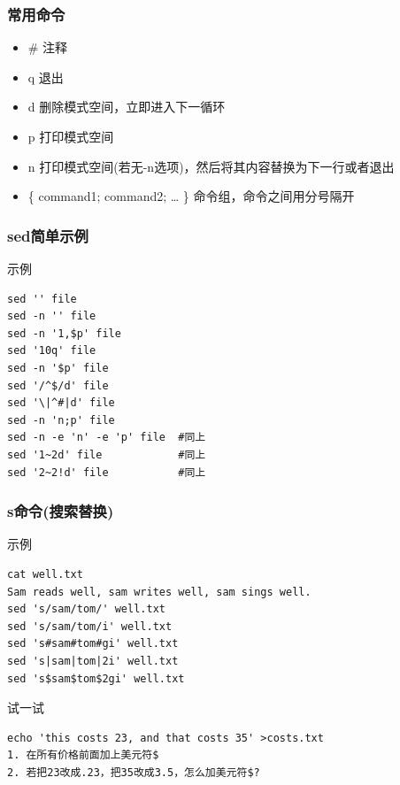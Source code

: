 \documentclass[xcolor=svgnames,presentation]{beamer}
\begin{document}
\begin{frame}
\frametitle{常用命令}
\label{sec-2-1-5}
\begin{itemize}

\item \#   注释
\label{sec-2-1-5-1}%

\item q    退出
\label{sec-2-1-5-2}%

\item d    删除模式空间，立即进入下一循环
\label{sec-2-1-5-3}%

\item p    打印模式空间
\label{sec-2-1-5-4}%

\item n    打印模式空间(若无-n选项)，然后将其内容替换为下一行或者退出
\label{sec-2-1-5-5}%

\item \{ command1; command2; \ldots{} \}    命令组，命令之间用分号隔开
\label{sec-2-1-5-6}%
\end{itemize} %
\end{frame}
\begin{frame}[fragile]
\frametitle{sed简单示例}
\label{sec-2-1-6}
\begin{exampleblock}{示例}
\label{sec-2-1-6-1}


\begin{verbatim}
sed '' file
sed -n '' file
sed -n '1,$p' file
sed '10q' file
sed -n '$p' file
sed '/^$/d' file
sed '\|^#|d' file
sed -n 'n;p' file
sed -n -e 'n' -e 'p' file  #同上
sed '1~2d' file            #同上
sed '2~2!d' file           #同上
\end{verbatim}
\end{exampleblock}
\end{frame}
\begin{frame}[fragile]
\frametitle{s命令(搜索替换)}
\label{sec-2-1-7}
\begin{exampleblock}{示例}
\label{sec-2-1-7-1}


\begin{verbatim}
cat well.txt
Sam reads well, sam writes well, sam sings well.
sed 's/sam/tom/' well.txt
sed 's/sam/tom/i' well.txt
sed 's#sam#tom#gi' well.txt
sed 's|sam|tom|2i' well.txt
sed 's$sam$tom$2gi' well.txt
\end{verbatim}
\end{exampleblock}
\begin{block}{试一试}
\label{sec-2-1-7-2}


\begin{verbatim}
echo 'this costs 23, and that costs 35' >costs.txt
1. 在所有价格前面加上美元符$
2. 若把23改成.23，把35改成3.5，怎么加美元符$?
\end{verbatim}
\end{block}
\end{frame}
\end{document}
